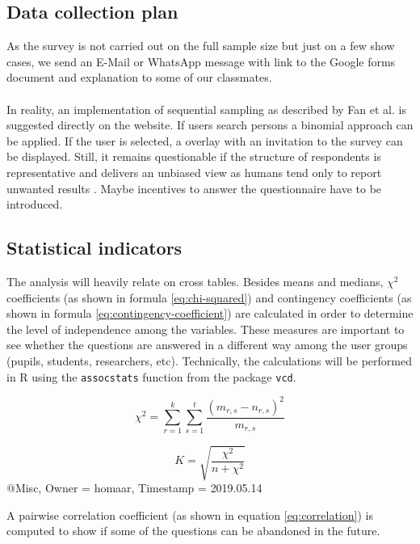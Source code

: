 \documentclass[12pt,a4paper,paper=a4,oneside,titlepage,pdftex]{scrartcl}
\begin{document}
\subsection{Data collection plan}
As the survey is not carried out on the full sample size but just on a few show cases, we send an E-Mail or WhatsApp message with link to the Google forms document and explanation to some of our classmates.
\\ \\
In reality, an implementation of sequential sampling as described by Fan et al. \cite{fan1962development} is suggested directly on the website. If users search persons a binomial approach can be applied. If the user is selected, a overlay with an invitation to the survey can be displayed. Still, it remains questionable if the structure of respondents is representative and delivers an unbiased view as humans tend only to report unwanted results \cite{bergstrand1983bias}. Maybe incentives to answer the questionnaire have to be introduced.

\subsection{Statistical indicators}
The analysis will heavily relate on cross tables. Besides means and medians, $\chi^2$ coefficients \cite{doi:10.1080/14786440009463897} (as shown in formula \ref{eq:chi-squared}) and contingency coefficients \cite{pearson1930theory} (as shown in formula \ref{eq:contingency-coefficient}) are calculated in order to determine the level of independence among the variables. These measures are important to see whether the questions are answered in a different way among the user groups (pupils, students, researchers, etc). Technically, the calculations will be performed in R using the \verb|assocstats| function from the package \verb|vcd|.

\begin{equation}
\chi^2 = \sum_{r=1}^{k}\sum_{s=1}^{t}\frac{(m_{r,s}-n_{r,s})^2}{m_{r,s}}
\label{eq:chi-squared}
\end{equation}

\begin{equation}
K = \sqrt{\frac{\chi^2}{n+\chi^2}}
\label{eq:contingency-coefficient}
\end{equation}@Misc{,
  Owner                    = {homaar},
  Timestamp                = {2019.05.14}
}


A pairwise correlation coefficient \cite{lee1988thirteen} (as shown in equation \ref{eq:correlation}) is computed to show if some of the questions can be abandoned in the future.
\end{document}
